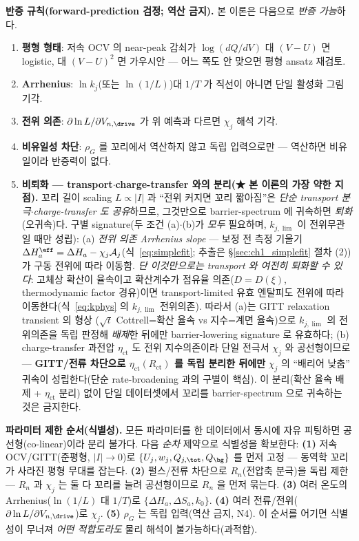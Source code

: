 \textbf{반증 규칙(forward-prediction 검정; 역산 금지).} 본 이론은 다음으로 \emph{반증 가능}하다.
\begin{enumerate}[label=(N\arabic*),leftmargin=2.4em]
\item \textbf{평형 형태}: 저속 OCV 의 near-peak 감쇠가 $\log(dQ/dV)$ 대 $(V-U)$ 면 logistic, 대 $(V-U)^2$
  면 가우시안 — 어느 쪽도 안 맞으면 평형 ansatz 재검토.
\item \textbf{Arrhenius}: $\ln k_j$(또는 $\ln(1/L)$)대 $1/T$ 가 직선이 아니면 단일 활성화 그림 기각.
\item \textbf{전위 의존}: $\partial\ln L/\partial V_{n,\drive}$ 가 위 예측과 다르면 $\chi_j$ 해석 기각.
\item \textbf{비유일성 차단}: $\rho_G$ 를 꼬리에서 역산하지 않고 독립 입력으로만 — 역산하면 비유일이라
  반증력이 없다.
\item \textbf{비퇴화 — transport$\cdot$charge-transfer 와의 분리(★ 본 이론의 가장 약한 지점).} 꼬리 길이 scaling
  $L\propto|I|$ 과 ``전위 커지면 꼬리 짧아짐''은 \emph{단순 transport 분극$\cdot$charge-transfer 도 공유}하므로,
  그것만으로 barrier-spectrum 에 귀속하면 \emph{퇴화}(오귀속)다. 구별 signature(두 조건 (a)$\cdot$(b)가 \emph{모두}
  필요하며, $k_{j,\lim}$ 이 전위무관일 때만 성립): (a) \emph{전위 의존 Arrhenius slope} — 보정 전 측정 기울기
  $\Delta H_a^{\eff}=\Delta H_a-\chi_j\mathcal A_j$(식~\eqref{eq:simplefit}; 추출은 \S\ref{sec:ch1_simplefit} 절차 (2))
  가 구동 전위에 따라 이동함. \emph{단 이것만으로는 transport 와 여전히 퇴화할 수 있다}: 고체상 확산이 율속이고
  확산계수가 점유율 의존($D=D(\xi)$, thermodynamic factor 경유)이면 transport-limited 유효 엔탈피도 전위에 따라
  이동한다(식~\eqref{eq:kphys} 의 $k_{j,\lim}$ 전위의존). 따라서 (a)는 GITT relaxation transient 의 형상
  ($\sqrt t$ Cottrell=확산 율속 vs 지수=계면 율속)으로 $k_{j,\lim}$ 의 전위의존을 독립 판정해 \emph{배제}한 뒤에만
  barrier-lowering signature 로 유효하다; (b) charge-transfer 과전압 $\eta_{\mathrm{ct}}$ 도 전위 지수의존이라 단일
  전극서 $\chi_j$ 와 공선형이므로 — \textbf{GITT/전류 차단으로 $\eta_{\mathrm{ct}}(R_{\mathrm{ct}})$ 를 독립 분리한
  뒤에만} $\chi_j$ 의 ``배리어 낮춤'' 귀속이 성립한다(단순 rate-broadening \cite{dubarry2022,fly2020} 과의 구별이
  핵심). 이 분리(확산 율속 배제 + $\eta_{\mathrm{ct}}$ 분리) 없이 단일 데이터셋에서 꼬리를 barrier-spectrum 으로
  귀속하는 것은 금지한다.
\end{enumerate}
\textbf{파라미터 제한 순서(식별성).} 모든 파라미터를 한 데이터에서 동시에 자유 피팅하면 공선형(co-linear)이라
분리 불가다. 다음 \emph{순차} 제약으로 식별성을 확보한다: \textbf{(1)} 저속 OCV/GITT(준평형, $|I|\to0$)로
$\{U_j,w_j,Q_{j,\tot},Q_\bg\}$ 를 먼저 고정 — 동역학 꼬리가 사라진 평형 무대를 잡는다. \textbf{(2)} 펄스/전류
차단으로 $R_n$(전압축 분극)을 독립 제한 — $R_n$ 과 $\chi_j$ 는 둘 다 꼬리를 늘려 공선형이므로 $R_n$ 을 먼저
묶는다. \textbf{(3)} 여러 온도의 Arrhenius($\ln(1/L)$ 대 $1/T$)로 $\{\Delta H_a,\Delta S_a,k_0\}$. \textbf{(4)}
여러 전류/전위($\partial\ln L/\partial V_{n,\drive}$)로 $\chi_j$. \textbf{(5)} $\rho_G$ 는 독립 입력(역산 금지,
N4). 이 순서를 어기면 식별성이 무너져 \emph{어떤 적합도라도} 물리 해석이 불가능하다(과적합).

